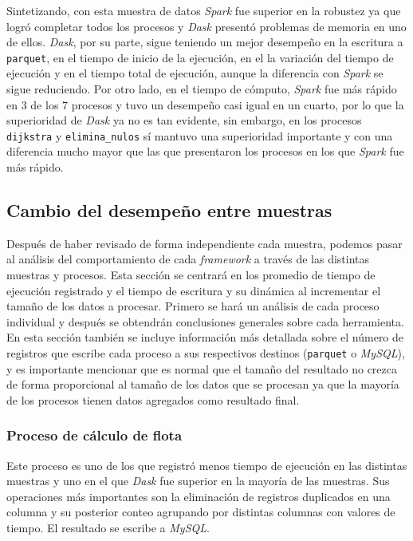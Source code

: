 Sintetizando, con esta muestra de datos \textit{Spark} fue superior en la robustez ya que logró completar todos los procesos y \textit{Dask} presentó problemas de memoria en uno de ellos. \textit{Dask}, por su parte, sigue teniendo un mejor desempeño en la escritura a \texttt{parquet}, en el tiempo de inicio de la ejecución, en el la variación del tiempo de ejecución y en el tiempo total de ejecución, aunque la diferencia con \textit{Spark} se sigue reduciendo. Por otro lado, en el tiempo de cómputo, \textit{Spark} fue más rápido en 3 de los 7 procesos y tuvo un desempeño casi igual en un cuarto, por lo que la superioridad de \textit{Dask} ya no es tan evidente, sin embargo, en los procesos \texttt{dijkstra} y \texttt{elimina\_nulos} sí mantuvo una superioridad importante y con una diferencia mucho mayor que las que presentaron los procesos en los que \textit{Spark} fue más rápido.


\subsection{Cambio del desempeño entre muestras}
\label{subsection:cambio-muestras-local}

Después de haber revisado de forma independiente cada muestra, podemos pasar al análisis del comportamiento de cada \textit{framework} a través de las distintas muestras y procesos. Esta sección se centrará en los promedio de tiempo de ejecución registrado y el tiempo de escritura y su dinámica al incrementar el tamaño de los datos a procesar. Primero se hará un análisis de cada proceso individual y después se obtendrán conclusiones generales sobre cada herramienta. En esta sección también se incluye información más detallada sobre el número de registros que escribe cada proceso a sus respectivos destinos (\texttt{parquet} o \textit{MySQL}), y es importante mencionar que es normal que el tamaño del resultado no crezca de forma proporcional al tamaño de los datos que se procesan ya que la mayoría de los procesos tienen datos agregados como resultado final.

\subsubsection{Proceso de cálculo de flota}

Este proceso es uno de los que registró menos tiempo de ejecución en las distintas muestras y uno en el que \textit{Dask} fue superior en la mayoría de las muestras. Sus operaciones más importantes son la eliminación de registros duplicados en una columna y su posterior conteo agrupando por distintas columnas con valores de tiempo. El resultado se escribe a \textit{MySQL}.

